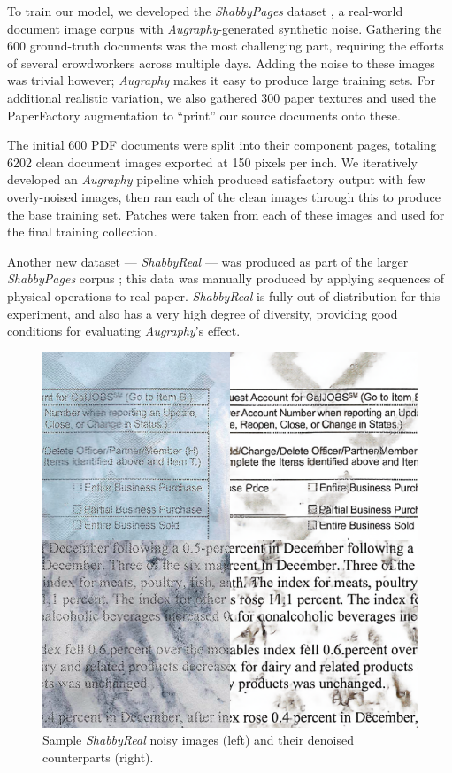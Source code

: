 \documentclass[runningheads]{llncs}
\begin{document}
To train our model, we developed the \emph{ShabbyPages} dataset \cite{ref_ShabbyPages}, a real-world document image corpus with \emph{Augraphy}-generated synthetic noise.
Gathering the 600 ground-truth documents was the most challenging part, requiring the efforts of several crowdworkers across multiple days. Adding the noise to these images was trivial however; \emph{Augraphy} makes it easy to produce large training sets.
For additional realistic variation, we also gathered 300 paper textures and used the PaperFactory augmentation to ``print'' our source documents onto these.

The initial 600 PDF documents were split into their component pages, totaling 6202 clean document images exported at 150 pixels per inch.
We iteratively developed an \emph{Augraphy} pipeline which produced satisfactory output with few overly-noised images, then ran each of the clean images through this to produce the base training set.
Patches were taken from each of these images and used for the final training collection.

Another new dataset --- \emph{ShabbyReal} --- was produced as part of the larger \emph{ShabbyPages} corpus \cite{ref_ShabbyPages}; this data was manually produced by applying sequences of physical operations to real paper. \emph{ShabbyReal} is fully out-of-distribution for this experiment, and also has a very high degree of diversity, providing good conditions for evaluating \emph{Augraphy}'s effect.

\begin{figure}
\centering
\includegraphics[width=0.9\columnwidth]{figures/shabbyreal_denoised.png}
\caption{Sample \emph{ShabbyReal} noisy images (left) and their denoised counterparts (right).}
\label{fig:shabbyreal_denoised}
\end{figure}
\end{document}
